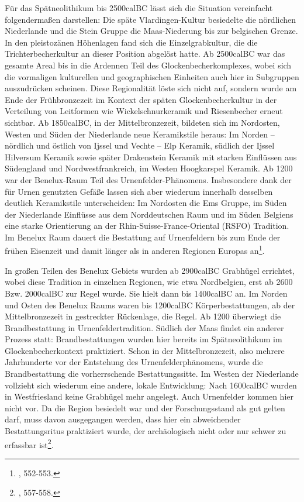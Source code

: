 \documentclass[openany,twoside,twocolumn]{book}
\let\rmarkdownfootnote\footnote%
\def\footnote{\protect\rmarkdownfootnote}
\begin{document}
Für das Spätneolithikum bis 2500calBC lässt sich die Situation
vereinfacht folgendermaßen darstellen: Die späte Vlardingen-Kultur
besiedelte die nördlichen Niederlande und die Stein Gruppe die
Maas-Niederung bis zur belgischen Grenze. In den pleistozänen Höhenlagen
fand sich die Einzelgrabkultur, die die Trichterbecherkultur an dieser
Position abgelöst hatte. Ab 2500calBC war das gesamte Areal bis in die
Ardennen Teil des Glockenbecherkomplexes, wobei sich die vormaligen
kulturellen und geographischen Einheiten auch hier in Subgruppen
auszudrücken scheinen. Diese Regionalität löste sich nicht auf, sondern
wurde am Ende der Frühbronzezeit im Kontext der späten
Glockenbecherkultur in der Verteilung von Leitformen wie
Wickelschnurkeramik und Riesenbecher erneut sichtbar. Ab 1850calBC, in
der Mittelbronzezeit, bildeten sich im Nordosten, Westen und Süden der
Niederlande neue Keramikstile heraus: Im Norden -- nördlich und östlich
von Ijssel und Vechte -- Elp Keramik, südlich der Ijssel Hilversum
Keramik sowie später Drakenstein Keramik mit starken Einflüssen aus
Südengland und Nordwestfrankreich, im Westen Hoogkarspel Keramik. Ab
1200 war der Benelux-Raum Teil des Urnenfelder-Phänomens. Insbesondere
dank der für Urnen genutzten Gefäße lassen sich aber wiederum innerhalb
desselben deutlich Keramikstile unterscheiden: Im Nordosten die Ems
Gruppe, im Süden der Niederlande Einflüsse aus dem Norddeutschen Raum
und im Süden Belgiens eine starke Orientierung an der
Rhin-Suisse-France-Oriental (RSFO) Tradition. Im Benelux Raum dauert die
Bestattung auf Urnenfeldern bis zum Ende der frühen Eisenzeit und damit
länger als in anderen Regionen Europas an\footnote{\textcite{fokkens_bronze_2013},
  552-553.}.

In großen Teilen des Benelux Gebiets wurden ab 2900calBC Grabhügel
errichtet, wobei diese Tradition in einzelnen Regionen, wie etwa
Nordbelgien, erst ab 2600 Bzw. 2000calBC zur Regel wurde. Sie hielt dann
bis 1400calBC an. Im Norden und Osten des Benelux Raums waren bis
1200calBC Körperbestattungen, ab der Mittelbronzezeit in gestreckter
Rückenlage, die Regel. Ab 1200 überwiegt die Brandbestattung in
Urnenfeldertradition. Südlich der Maas findet ein anderer Prozess statt:
Brandbestattungen wurden hier bereits im Spätneolithikum im
Glockenbecherkontext praktiziert. Schon in der Mittelbronzezeit, also
mehrere Jahrhunderte vor der Entstehung des Urnenfelderphänomens, wurde
die Brandbestattung die vorherrschende Bestattungssitte. Im Westen der
Niederlande vollzieht sich wiederum eine andere, lokale Entwicklung:
Nach 1600calBC wurden in Westfriesland keine Grabhügel mehr angelegt.
Auch Urnenfelder kommen hier nicht vor. Da die Region besiedelt war und
der Forschungsstand als gut gelten darf, muss davon ausgegangen werden,
dass hier ein abweichender Bestattungsritus praktiziert wurde, der
archäologisch nicht oder nur schwer zu erfassbar ist\footnote{\textcite{fokkens_bronze_2013},
  557-558.}.
\end{document}
